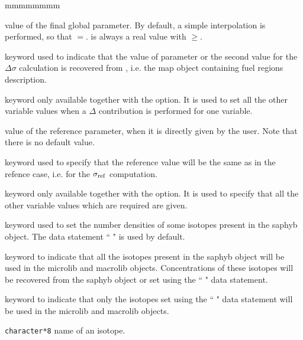 \begin{ListeDeDescription}{mmmmmmmm}
\item[\dusa{val2}] value of the final global parameter. By default, a simple interpolation is performed, so that $=$.  is always a real value with $\ge$.

\item[\moc{MAP}] keyword used to indicate that the value of parameter  or the second value for the $\Delta\sigma$ calculation is
recovered from , i.e. the {\sc map} object containing fuel regions description.

\item[\moc{REF}] keyword only available together with the  option. It is used to set all the other variable values when a $\Delta$ contribution is performed for one variable.  

\item[\dusa{valref}] value of the reference parameter, when it is directly given by the user. Note that there is no default value.

\item[\moc{SAMEASREF}] keyword used to specify that the reference value will be the same as in the refence case, i.e. for the $\sigma_{\rm ref}$ computation.

\item[\moc{ENDREF}] keyword only available together with the  option. It is used to specify that all the other variable values which are required are given.  

\item[\moc{MICRO}] keyword used to set the number densities of some isotopes present in the {\sc saphyb} object. The data statement `` " is used by default.

\item[\moc{ALL}] keyword to indicate that all the isotopes present in the  {\sc saphyb} object will be used in the {\sc microlib} and {\sc macrolib} objects. Concentrations of these isotopes will be recovered from the {\sc saphyb} object or set using
the `` " data statement.

\item[\moc{ONLY}] keyword to indicate that only the isotopes set using the `` " data statement will be used in the {\sc microlib} and {\sc macrolib} objects.

\item[\dusa{HISO}] {\tt character*8} name of an isotope.


\end{ListeDeDescription}
